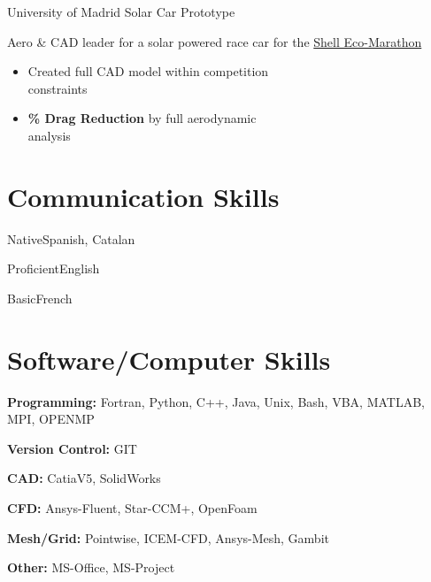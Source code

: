 \documentclass[fontsize=10pt]{tccv}
\begin{document}
\begin{eventlist}
     {University of Madrid}
     {Solar Car Prototype}

Aero \& CAD leader for a solar powered race car for the \href{http://www.shell.com/global/environment-society/ecomarathon.html}{Shell Eco-Marathon}
\begin{itemize}
\itemsep -1pt
	\item Created full CAD model within competition \\constraints
	\item \textbf{\% Drag Reduction} by full aerodynamic \\analysis
\end{itemize}
\end{eventlist}

\section{Communication Skills}
\begin{factlist}
\item{Native}{Spanish, Catalan}
\item{Proficient}{English}
\item{Basic}{French}
\end{factlist}

\vspace{-20pt}
\section{Software/Computer Skills}
\begin{factlist}
\item{\textbf{Programming:}}
     {Fortran, Python, C++, Java, Unix, Bash, VBA, MATLAB, MPI, OPENMP}
\item{\textbf{Version Control:}}
     {GIT}
\item{\textbf{CAD:}}
     {CatiaV5, SolidWorks}
\item{\textbf{CFD:}}
     {Ansys-Fluent, Star-CCM+, OpenFoam}
\item{\textbf{Mesh/Grid:}}
     {Pointwise, ICEM-CFD, Ansys-Mesh, Gambit}
\item{\textbf{Other:}}
     {MS-Office, MS-Project}
\end{factlist}


\vspace{-20pt}
\end{document}
